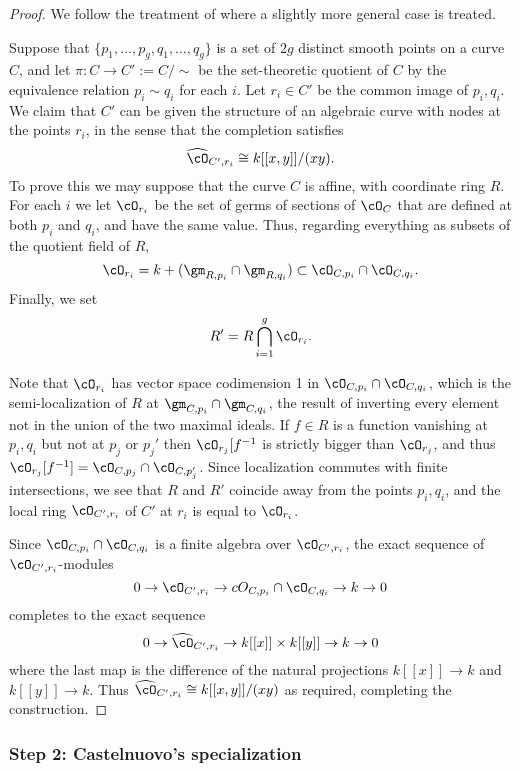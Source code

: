 \begin{proof}
We follow the treatment of \cite{Serre1979}
 where a slightly more general case is treated.
 
Suppose that $\{ p_1,\dots, p_g, q_1,\dots, q_g  \}$ is a set of $2g$ distinct smooth points on a curve $C$, and let $\pi: C \to C':=C/\sim$ be the set-theoretic quotient of $C$ by the equivalence relation
 $p_i\sim q_i$ for each $i$. Let $r_i\in C'$ be the common image of $p_i, q_i$. We claim that $C'$ can be given the structure of an  algebraic curve with nodes at the points $r_i$, in the sense that the completion satisfies
$$
\widehat\cO_{C', r_i} \cong k[[x,y]]/(xy).
$$
 To prove this we may suppose that the curve $C$ is affine, with coordinate ring $R$.
For each $i$ we let $\cO_{r_i}$  be the set of germs of sections of $\cO_C$ that are
 defined at both $p_i$ and $q_i$, and have the same value. Thus, regarding everything
 as subsets of the quotient field of $R$, 
 $$
 \cO_{r_i} = k+(\gm_{R,p_i} \cap \gm_{R,q_i}) \subset \cO_{C,p_i}\cap \cO_{C,q_i}.
 $$
 Finally, we set 
 $$
 R' = R \bigcap_{i=1}^g \cO_{r_i}.
 $$

Note that $\cO_{r_i}$ has vector space codimension 1 in 
 $\cO_{C,p_i}\cap \cO_{C,q_i}$, which is the semi-localization of $R$ at
 $\gm_{C,p_i}\cap \gm_{C,q_i}$, the result of inverting every element not in the 
 union of the two maximal ideals. If $f\in R$ is a function vanishing at $p_i, q_i$ but not at $p_j$ or $p_j'$
then $\cO_{r_j}[f^{-1}$ is strictly bigger than
$\cO_{r_j}$, and thus $\cO_{r_j} [f^{-1}] = \cO_{C,p_j} \cap \cO_{C,p_j'}$.
Since localization commutes with finite intersections, we see that $R$ and $R'$
coincide away from the points $p_i,q_i$, and the local ring $\cO_{C',r_i}$ of $C'$ at $r_i$ is
equal to $\cO_{r_i}$.

Since $\cO_{C,p_i}\cap \cO_{C,q_i}$ is a finite algebra over $\cO_{C', r_i}$,
the exact sequence of $\cO_{C', r_i}$-modules
$$
0\to \cO_{C', r_i} \to cO_{C,p_i}\cap \cO_{C,q_i} \to k \to 0
$$
completes to the exact sequence
$$
0\to \widehat\cO_{C', r_i} \to k[[x]]\times k[[y]] \to k \to 0
$$
where the last map is the difference of the natural projections
$k[[x]] \to k$ and $k[[y]] \to k$. Thus
$\widehat\cO_{C', r_i} \cong k[[x,y]]/(xy)$ as required, completing the construction.
\end{proof}


\subsubsection{Step 2: Castelnuovo's specialization}

